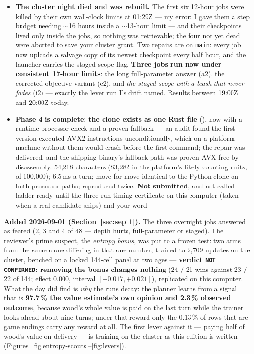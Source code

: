 \documentclass[11pt,a4paper]{article}
\newcommand{\fp}[1]{{\small\path{#1}}}
\begin{document}
\begin{itemize}[nosep,leftmargin=1.4em]
  \item \textbf{The cluster night died and was rebuilt.} The first six 12-hour jobs were killed by their own wall-clock limits at 01:29Z --- my error: I gave them a step budget needing $\sim$16 hours inside a $\sim$13-hour limit --- and their checkpoints lived only inside the jobs, so nothing was retrievable; the four not yet dead were aborted to save your cluster grant. Two repairs are on \texttt{main}: every job now uploads a salvage copy of its newest checkpoint every half hour, and the launcher carries the staged-scope flag. \textbf{Three jobs run now under consistent 17-hour limits}: the long full-parameter answer (a2), the corrected-objective variant (e2), and \emph{the staged scope with a leash that never fades} (i2) --- exactly the lever run I's drift named. Results between 19:00Z and 20:00Z today.
  \item \textbf{Phase 4 is complete: the clone exists as one Rust file} (\fp{cgauto/submissions/candidate-nn-clone.rs}), now with a runtime processor check and a proven fallback --- an audit found the first version executed AVX2 instructions unconditionally, which on a platform machine without them would crash before the first command; the repair was delivered, and the shipping binary's fallback path was proven AVX-free by disassembly. 54,218 characters (83,282 in the platform's likely counting units, of 100,000); 6.5\,ms a turn; move-for-move identical to the Python clone on both processor paths; reproduced twice. \textbf{Not submitted}, and not called ladder-ready until the three-run timing certificate on this computer (taken when a real candidate ships) and your word.
\end{itemize}

\textbf{Added 2026-09-01 (Section~\ref{sec:sept1}).} The three overnight jobs answered as feared (2, 3 and 4 of 48 --- depth hurts, full-parameter or staged). The reviewer's prime suspect, the \emph{entropy bonus}, was put to a frozen test: two arms from the same clone differing in that one number, trained to 2,709 updates on the cluster, benched on a locked 144-cell panel at two ages --- \textbf{verdict \texttt{NOT CONFIRMED}: removing the bonus changes nothing} (24 / 21 wins against 23 / 22 of 144; effect $0.000$, interval $[-0.017, +0.021]$), replicated on this computer. What the day did find is \emph{why} the runs decay: the planner learns from a signal that is \textbf{97.7\,\% the value estimate's own opinion and 2.3\,\% observed outcome}, because wood's whole value is paid on the last turn while the trainer looks ahead about nine turns; under that reward only the 0.13\,\% of rows that are game endings carry any reward at all. The first lever against it --- paying half of wood's value on delivery --- is training on the cluster as this edition is written (Figures~\ref{fig:entropy-scouts}--\ref{fig:levers}).
\end{document}
